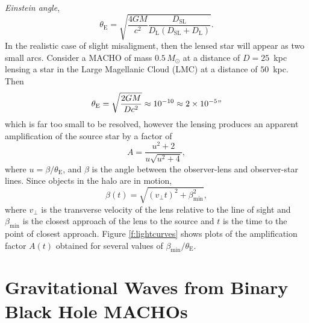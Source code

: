 \emph{Einstein angle},
\begin{equation}
\theta_\mathrm{E} = \sqrt{\frac{4GM}{c^2} \frac{D_\mathrm{SL}}
{D_\mathrm{L}\left(D_\mathrm{SL} + D_\mathrm{L}\right)}}.
\end{equation}
In the realistic case of slight misaligment, then the lensed star will appear
as two small arcs. Consider a MACHO of mass $0.5\,M_\odot$ at a distance of $D
= 25$~kpc lensing a star in the Large Magellanic Cloud (LMC) at a distance of
$50$~kpc. Then
\begin{equation}
\theta_\mathrm{E} = \sqrt{\frac{2GM}{Dc^2}} \approx 10^{-10} \approx 2 \times
10^{-5}"
\end{equation}
which is far too small to be resolved, however the lensing produces an
apparent amplification of the source star\cite{1964MNRAS.128..295R} by a
factor of
\begin{equation}
A = \frac{u^2 + 2}{u\sqrt{u^2 + 4}},
\end{equation}
where $u = \beta / \theta_\mathrm{E}$, and $\beta$ is the angle between the
observer-lens and observer-star lines. Since objects in the halo are in
motion,
\begin{equation}
\beta(t) = \sqrt{ (v_\perp t)^2 + \beta_\mathrm{min}^2 },
\end{equation}
where $v_\perp$ is the transverse velocity of the lens relative to the 
line of sight and $\beta_\mathrm{min}$ is the closest approach of the lens to
the source and $t$ is the time to the point of closest
approach\cite{Paczynski:1985jf,Griest:1990vu}. Figure \ref{f:lightcurves}
shows plots of the amplification factor $A(t)$ obtained for several values of
$\beta_\mathrm{min} / \theta_\mathrm{E}$.


























\section{Gravitational Waves from Binary Black Hole MACHOs}
\label{s:bbhmacho}

